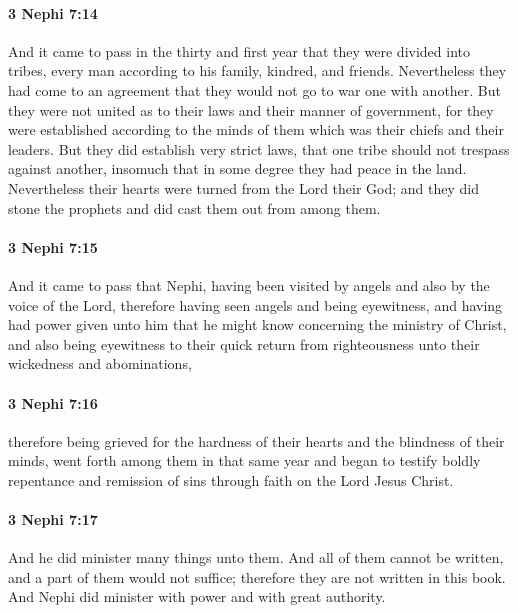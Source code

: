 		\paragraph{3 Nephi 7:14} %
			\label{3NEPHI-7-14}

			And it came to pass in the thirty and first year
			that they were divided into tribes,
			every man according to his family, kindred, and friends.
			Nevertheless they had come to an agreement
			that they would not go to war one with another.
			But they were not united as to their laws and their manner of government,
			for they were established according to the minds of them
			which was their chiefs and their leaders.
			But they did establish very strict laws,
			that one tribe should not trespass against another,
			insomuch that in some degree they had peace in the land.
			Nevertheless their hearts were turned from the Lord their God;
			and they did stone the prophets and did cast them out from among them.

		\paragraph{3 Nephi 7:15} %
			\label{3NEPHI-7-15}

			And it came to pass that
			Nephi, having been visited by angels and also by the voice of the Lord,
			therefore having seen angels and being eyewitness,
			and having had power given unto him
			that he might know concerning the ministry of Christ,
			and also being eyewitness to their quick return from righteousness
			unto their wickedness and abominations,

		\paragraph{3 Nephi 7:16} %
			\label{3NEPHI-7-16}

			therefore being grieved for the hardness of their hearts
			and the blindness of their minds,
			went forth among them in that same year
			and began to testify boldly
			repentance and remission of sins through faith on the Lord Jesus Christ.

		\paragraph{3 Nephi 7:17} %
			\label{3NEPHI-7-17}

			And he did minister many things unto them.
			And all of them cannot be written,
			and a part of them would not suffice;
			therefore they are not written in this book.
			And Nephi did minister with power and with great authority.


